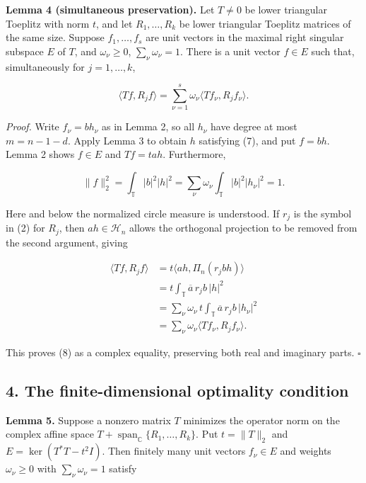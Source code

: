 \documentclass[10pt,a4paper]{article}
\begin{document}

\textbf{Lemma 4 (simultaneous preservation).} Let \(T\ne0\) be lower
triangular Toeplitz with norm \(t\), and let \(R_1,\ldots,R_k\) be lower
triangular Toeplitz matrices of the same size. Suppose
\(f_1,\ldots,f_s\) are unit vectors in the maximal right singular
subspace \(E\) of \(T\), and \(\omega_\nu\ge0\),
\(\sum_\nu\omega_\nu=1\). There is a unit vector \(f\in E\) such that,
simultaneously for \(j=1,\ldots,k\),

\nopagebreak[4]

\[
\langle Tf,R_j f\rangle
=\sum_{\nu=1}^{s}\omega_\nu\langle Tf_\nu,R_j f_\nu\rangle.
\tag{8}
\]

\emph{Proof.} Write \(f_\nu=b h_\nu\) as in Lemma 2, so all \(h_\nu\)
have degree at most \(m=n-1-d\). Apply Lemma 3 to obtain \(h\)
satisfying (7), and put \(f=bh\). Lemma 2 shows \(f\in E\) and
\(Tf=tah\). Furthermore,

\nopagebreak[4]

\[
\|f\|_2^2
=\int_{\mathbb T}|b|^2|h|^2
=\sum_\nu\omega_\nu\int_{\mathbb T}|b|^2|h_\nu|^2
=1.
\tag{9}
\]

Here and below the normalized circle measure is understood. If \(r_j\)
is the symbol in (2) for \(R_j\), then \(ah\in\mathcal H_n\) allows the
orthogonal projection to be removed from the second argument, giving

\nopagebreak[4]

\[
\begin{aligned}
\langle Tf,R_jf\rangle
&=t\langle ah,\Pi_n(r_j b h)\rangle\\
&=t\int_{\mathbb T}\overline a\,r_j b\,|h|^2\\
&=\sum_\nu\omega_\nu\,t\int_{\mathbb T}
  \overline a\,r_j b\,|h_\nu|^2\\
&=\sum_\nu\omega_\nu\langle Tf_\nu,R_jf_\nu\rangle.
\end{aligned}
\tag{10}
\]

This proves (8) as a complex equality, preserving both real and
imaginary parts. \(\square\)

\subsection{4. The finite-dimensional optimality
condition}\label{the-finite-dimensional-optimality-condition}

\textbf{Lemma 5.} Suppose a nonzero matrix \(T\) minimizes the operator
norm on the complex affine space \(T+\operatorname{span}_{\mathbb C}
\{R_1,\ldots,R_k\}\). Put \(t=\|T\|_2\) and \(E=\ker(T^*T-t^2I)\). Then
finitely many unit vectors \(f_\nu\in E\) and weights \(\omega_\nu\ge0\)
with \(\sum_\nu\omega_\nu=1\) satisfy
\end{document}
